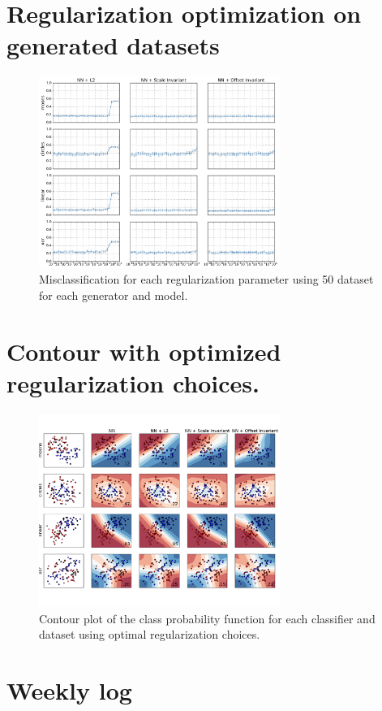
\onecolumn
\section{Regularization optimization on generated datasets}
\label{appendix:regualization-optimization}
\begin{figure}[H]
	\centering
	\includegraphics[width=0.7\textwidth]{plots/syntetic_reg_opt}
	\caption{Misclassification for each regularization parameter using 50 dataset for each generator and model.}
\end{figure}

\section{Contour with optimized regularization choices.}
\label{appendix:generated-contour-optimized}
\begin{figure}[H]
	\centering
	\includegraphics[width=0.7\textwidth, trim = 0 2.2cm 0 1.5cm, clip]{plots/2d_classifier-optimized}
	\caption{Contour plot of the class probability function for each classifier and dataset using optimal regularization choices.}
\end{figure}

\twocolumn
\section{Weekly log}










